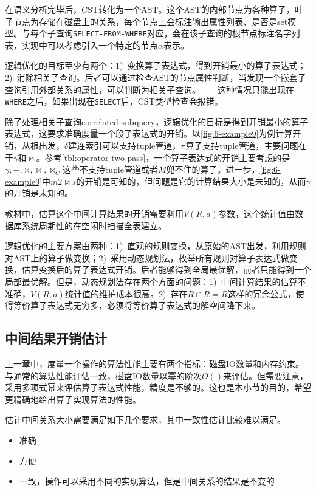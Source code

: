 在语义分析完毕后，CST转化为一个AST。这个AST的内部节点为各种算子，叶子节点为存储在磁盘上的关系，每个节点上会标注输出属性列表、是否是set模型。与每个子查询\texttt{SELECT-FROM-WHERE}对应，会在该子查询的根节点标注名字列表，实现中可以考虑引入一个特定的节点$\alpha$表示。

逻辑优化的目标至少有两个：1)~变换算子表达式，得到开销最小的算子表达式；2)~消除相关子查询。后者可以通过检查AST的节点属性判断，当发现一个嵌套子查询引用外部关系的属性，可以判断为相关子查询。——这种情况只能出现在\texttt{WHERE}之后，如果出现在\texttt{SELECT}后，CST类型检查会报错。

除了处理相关子查询correlated subquery，逻辑优化的目标是得到开销最小的算子表达式，这要求准确度量一个段子表达式的开销。以\figurename\ref{fig:6-example9}为例计算开销，从根出发，$\delta$建连索引可以支持tuple管道，$\pi$算子支持tuple管道，主要问题在于$\gamma$和$\bowtie$。参考\tablename\ref{tbl:operator-two-pass}，一个算子表达式的开销主要考虑的是$\gamma, -, \times, \bowtie, \bowtie_C$这些不支持tuple管道或者$M$兜不住的算子。进一步，\figurename\ref{fig:6-example9}中$m2 \bowtie s$的开销是可知的，但问题是它的计算结果大小是未知的，从而$\gamma$的开销是未知的。

教材中，估算这个中间计算结果的开销需要利用$V(R,a)$参数，这个统计值由数据库系统周期性的在空闲时扫描全表建立。

逻辑优化的主要方案由两种：1)~直观的规则变换，从原始的AST出发，利用规则对AST上的算子做变换；2)~采用动态规划法，枚举所有规则对算子表达式做变换，估算变换后的算子表达式开销。后者能够得到全局最优解，前者只能得到一个局部最优解。但是，动态规划法存在两个方面的问题：1)~中间计算结果的估算不准确，$V(R,a)$统计值的维护成本很高。2)~存在$R \cap R=R$这样的冗余公式，使得等价算子表达式无穷多，必须将等价算子表达式的解空间降下来。

\subsection{中间结果开销估计}

上一章中，度量一个操作的算法性能主要有两个指标：磁盘IO数量和内存约束。与通常的算法性能评估一致，磁盘IO数量以幂的阶次$O()$来评估。但需要注意，采用多项式幂来评估算子表达式性能，精度是不够的。这也是本小节的目的，希望更精确地给出算子实现算法的性能。

估计中间关系大小需要满足如下几个要求，其中一致性估计比较难以满足。
\begin{itemize}
    \item 准确
    \item 方便
    \item 一致，操作可以采用不同的实现算法，但是中间关系的结果是不变的
\end{itemize}

